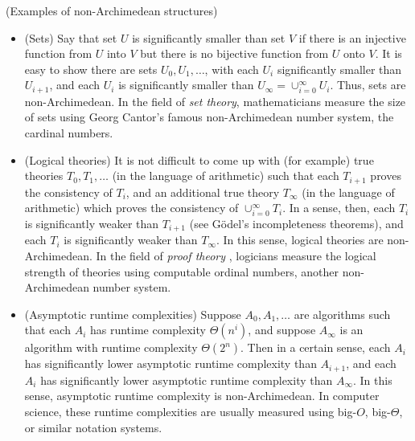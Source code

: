 \documentclass[twoside,11pt]{article}
\begin{document}
\begin{example}
\label{nonexamples}
(Examples of non-Archimedean structures)
    \begin{itemize}
        \item
        (Sets)
        Say that set $U$ is significantly smaller than set $V$ if there is an injective
        function from $U$ into $V$ but there is no bijective function from $U$
        onto $V$. It is easy to show there are sets $U_0,U_1,\ldots$, with each
        $U_{i}$ significantly smaller than $U_{i+1}$, and each $U_i$ is
        significantly smaller than
        $U_\infty=\cup_{i=0}^\infty U_i$.
        Thus, sets are
        non-Archimedean. In the field of \emph{set theory}, mathematicians measure
        the size of sets using Georg Cantor's famous non-Archimedean number system,
        the cardinal numbers.
        \item
        (Logical theories)
        It is not difficult to come up with (for example) true
        theories $T_0,T_1,\ldots$ (in the language of arithmetic) such that
        each $T_{i+1}$ proves the consistency of $T_i$, and an additional
        true theory $T_\infty$ (in the language of arithmetic)
        which proves the consistency of $\cup_{i=0}^\infty T_i$.
        In a sense, then, each $T_i$ is significantly weaker than $T_{i+1}$
        (see G\"odel's incompleteness theorems), and each $T_i$ is
        significantly weaker than $T_\infty$. In this sense, logical theories
        are non-Archimedean. In the field
        of \emph{proof theory} \citep{pohlers2008proof, rathjen},
        logicians measure the logical strength of theories using computable
        ordinal numbers, another non-Archimedean number system.
        \item
        (Asymptotic runtime complexities)
        Suppose $A_0,A_1,\ldots$ are algorithms such that each $A_i$ has
        runtime complexity $\Theta(n^i)$, and suppose $A_\infty$ is an algorithm
        with runtime complexity $\Theta(2^n)$. Then in a certain sense, each
        $A_{i}$ has significantly lower asymptotic runtime complexity than $A_{i+1}$,
        and each $A_i$ has significantly lower asymptotic runtime complexity than
        $A_\infty$. In this sense, asymptotic runtime complexity is non-Archimedean.
        In computer science, these runtime complexities are usually measured using
        big-$O$, big-$\Theta$, or similar notation systems.
    \end{itemize}
\end{example}
\end{document}
